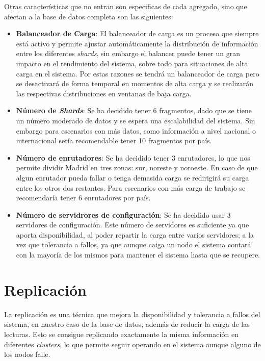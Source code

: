 \documentclass[]{article}
\begin{document}
Otras características que no entran son especificas de cada agregado, sino que afectan a la base de datos completa son las siguientes:
\begin{itemize}
    \item \textbf{Balanceador de Carga}: El balanceador de carga es un proceso que siempre está activo y permite ajustar automáticamente la distribución de información entre los diferentes \textit{shards}, sin embargo el balancer puede tener un gran impacto en el rendimiento del sistema, sobre todo para situaciones de alta carga en el sistema. Por estas razones se tendrá un balanceador de carga pero se desactivará de forma temporal en momentos de alta carga y se realizarán las respectivas distribuciones en ventanas de baja carga.
    \item \textbf{Número de \textit{Shards}}: Se ha decidido tener 6 fragmentos, dado que se tiene un número moderado de datos y se espera una escalabilidad del sistema. Sin embargo para escenarios con más datos, como información a nivel nacional o internacional sería recomendable tener 10 fragmentos por país.
    \item \textbf{Número de enrutadores}: Se ha decidido tener 3 enrutadores, lo que nos permite dividir Madrid en tres zonas: sur, noreste y noroeste. En caso de que algun enrutador pueda fallar o tenga demasida carga se redirigirá su carga entre los otros dos restantes. Para escenarios con más carga de trabajo se recomendaría tener 6 enrutadores por país.
    \item \textbf{Número de servidrores de configuración}: Se ha decidido usar 3 servidores de configuración. Este número de servidores es suficiente ya que aporta disponibilidad, al poder repartir la carga entre varios servidores; a la vez que tolerancia a fallos, ya que aunque caiga un nodo el sistema contará con la mayoría de los mismos para mantener el sistema hasta que se recupere.
\end{itemize}

\section{Replicación}
\label{sec:replicacion}

La replicación es una técnica que mejora la disponibilidad y tolerancia a fallos del sistema, en nuestro caso de la base de datos, además de reducir la carga de las lecturas. Esto se consigue replicando exactamente la misma información en diferentes \textit{clusters}, lo que permite seguir operando en el sistema aunque alguno de los nodos falle.
\end{document}
